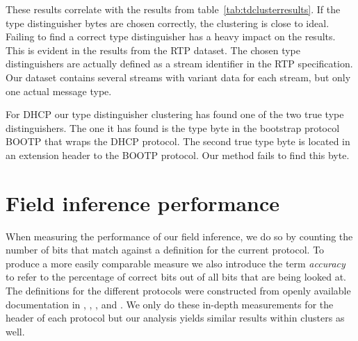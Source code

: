 \documentclass[a4paper]{report}
\begin{document}
These results correlate with the results from table~\ref{tab:tdclusterresults}.
If the type distinguisher bytes are chosen correctly, the clustering is close
to ideal. Failing to find a correct type distinguisher has a heavy impact on
the results. This is evident in the results from the RTP dataset. The chosen
type distinguishers are actually defined as a stream identifier in the RTP
specification. Our dataset contains several streams with variant data for
each stream, but only one actual message type.

For DHCP our type distinguisher clustering has found one of the two true
type distinguishers. The one it has found is the type byte in the
bootstrap protocol BOOTP that wraps the DHCP protocol. The second true type
byte is located in an extension header to the BOOTP protocol. Our method fails
to find this byte.


\section{Field inference performance}
\label{sec:fieldperf}
%
When measuring the performance of our field inference, we do so by counting the
number of bits that match against a definition for the current protocol. To
produce a more easily comparable measure we also introduce the term
\emph{accuracy} to refer to the percentage of correct bits out of all bits that
are being looked at. The definitions for the different protocols were
constructed from openly available documentation in ,
, , 
and . We only do these in-depth measurements for the
header of each protocol but our analysis yields similar results within clusters
as well.
\end{document}
